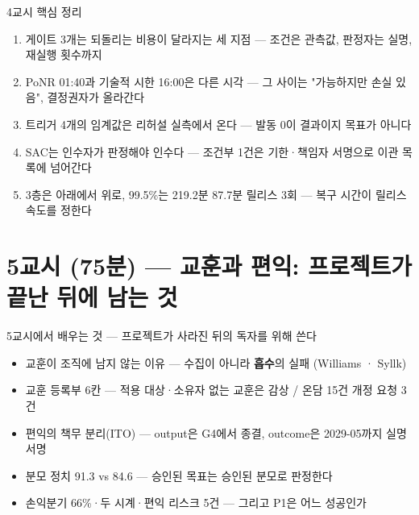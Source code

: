 \begin{frame}{4교시 핵심 정리}
\begin{enumerate}
\item 게이트 3개는 되돌리는 비용이 달라지는 세 지점 — 조건은 관측값, 판정자는 실명, 재실행 횟수까지
\item PoNR 01:40과 기술적 시한 16:00은 다른 시각 — 그 사이는 "가능하지만 손실 있음", 결정권자가 올라간다
\item 트리거 4개의 임계값은 리허설 실측에서 온다 — 발동 0이 결과이지 목표가 아니다
\item SAC는 인수자가 판정해야 인수다 — 조건부 1건은 기한·책임자 서명으로 이관 목록에 넘어간다
\item 3층은 아래에서 위로, 99.5\%는 219.2분 \ra{} 87.7분 \ra{} 릴리스 3회 — 복구 시간이 릴리스 속도를 정한다
\end{enumerate}
\end{frame}

\section{5교시 (75분) — 교훈과 편익: 프로젝트가 끝난 뒤에 남는 것}

\begin{frame}{5교시에서 배우는 것 — 프로젝트가 사라진 뒤의 독자를 위해 쓴다}
\begin{itemize}
\item 교훈이 조직에 남지 않는 이유 — 수집이 아니라 \textbf{흡수}의 실패 (Williams · Syllk)
\item 교훈 등록부 6칸 — 적용 대상·소유자 없는 교훈은 감상 / 온담 15건 \ra{} 개정 요청 3건
\item 편익의 책무 분리(ITO) — output은 G4에서 종결, outcome은 2029-05까지 실명 서명
\item 분모 정치 91.3 vs 84.6 — 승인된 목표는 승인된 분모로 판정한다
\item 손익분기 66\%·두 시계·편익 리스크 5건 — 그리고 P1은 어느 성공인가
\end{itemize}
\end{frame}

